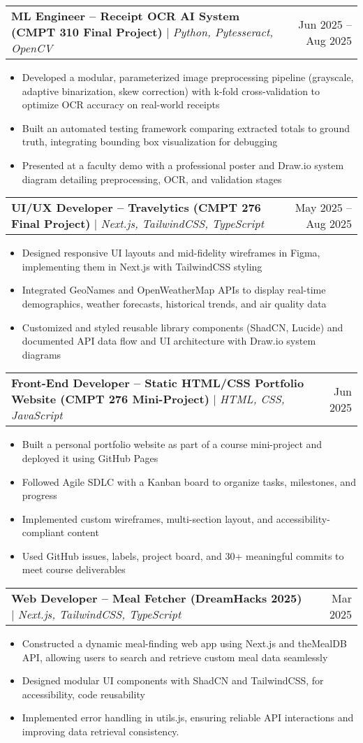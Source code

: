 \documentclass[letterpaper,10pt]{article}
\makeatletter
\newcommand{\resumeItem}[1]{
  \item\small{
    {#1 \vspace{-2pt}}
  }
}
\newcommand{\resumeProjectHeading}[2]{
    \item
    \begin{tabular*}{0.97\textwidth}{l@{\extracolsep{\fill}}r}
      \small#1 & #2 \\
    \end{tabular*}\vspace{-7pt}
}
\newcommand{\resumeItemListStart}{\begin{itemize}}
\newcommand{\resumeItemListEnd}{\end{itemize}\vspace{-5pt}}
\makeatother
\begin{document}
   \resumeProjectHeading
  {\textbf{ML Engineer – Receipt OCR AI System (CMPT 310 Final Project)} $|$ \emph{Python, Pytesseract, OpenCV}}{Jun 2025 -- Aug 2025}
    \resumeItemListStart
      \resumeItem{Developed a modular, parameterized image preprocessing pipeline (grayscale, adaptive binarization, skew correction) with k-fold cross-validation to optimize OCR accuracy on real-world receipts}
      \resumeItem{Built an automated testing framework comparing extracted totals to ground truth, integrating bounding box visualization for debugging}
      \resumeItem{Presented at a faculty demo with a professional poster and Draw.io system diagram detailing preprocessing, OCR, and validation stages}
    \resumeItemListEnd



  
    \resumeProjectHeading
  {\textbf{UI/UX Developer – Travelytics (CMPT 276 Final Project)} $|$ \emph{Next.js, TailwindCSS, TypeScript}}{May 2025 -- Aug 2025}
    \resumeItemListStart
      \resumeItem{Designed responsive UI layouts and mid-fidelity wireframes in Figma, implementing them in Next.js with TailwindCSS styling}
      \resumeItem{Integrated GeoNames and OpenWeatherMap APIs to display real-time demographics, weather forecasts, historical trends, and air quality data}
      \resumeItem{Customized and styled reusable library components (ShadCN, Lucide) and documented API data flow and UI architecture with Draw.io system diagrams}
    \resumeItemListEnd

    
    

    \resumeProjectHeading
      {\textbf{Front-End Developer – Static HTML/CSS Portfolio Website (CMPT 276 Mini-Project)} $|$ \emph{HTML, CSS, JavaScript}}{Jun 2025}
      \resumeItemListStart
        \resumeItem{Built a personal portfolio website as part of a course mini-project and deployed it using GitHub Pages}
        \resumeItem{Followed Agile SDLC with a Kanban board to organize tasks, milestones, and progress}
        \resumeItem{Implemented custom wireframes, multi-section layout, and accessibility-compliant content}
        \resumeItem{Used GitHub issues, labels, project board, and 30+ meaningful commits to meet course deliverables}
    \resumeItemListEnd

    \resumeProjectHeading
      {\textbf{Web Developer -- Meal Fetcher (DreamHacks 2025)} $|$ \emph{Next.js, TailwindCSS, TypeScript}}{Mar 2025}
      \resumeItemListStart
        \resumeItem{Constructed a dynamic meal-finding web app using Next.js and theMealDB API, allowing users to search and retrieve custom meal data seamlessly}
        \resumeItem{Designed modular UI components with ShadCN and TailwindCSS, for accessibility, code reusability}
        \resumeItem{Implemented error handling in utils.js, ensuring reliable API interactions and improving data retrieval consistency.}
      \resumeItemListEnd
\end{document}
